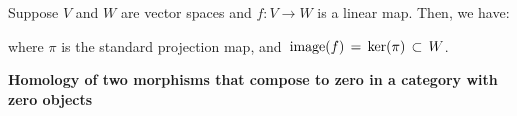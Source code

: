 
\vskip 0.5cm
\begin{remark}
\mbox{}
\vskip 0.15cm
\noindent
Suppose $V$ and $W$ are vector spaces and $f : V \longrightarrow W$ is a linear map.
Then, we have:
\begin{center}
\end{center}
where $\pi$ is the standard projection map, and
\,$\textnormal{image}(f) \,=\, \ker(\pi) \,\subset\, W$.
\end{remark}


\vskip 1.0cm
\noindent
\textbf{\large Homology of two morphisms that compose to zero in a category with zero objects}


